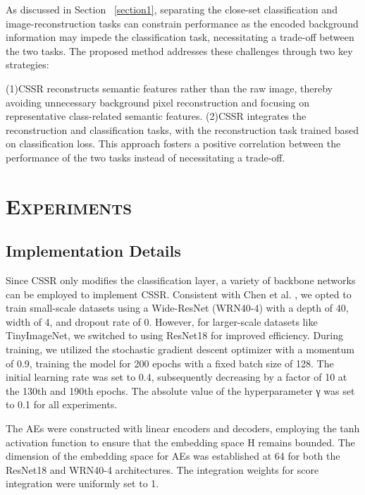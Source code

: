 \documentclass{gji}
\begin{document}
As discussed in Section ~\ref{section1}, separating the close-set classification and image-reconstruction tasks can constrain performance as the encoded background information may impede the classification task, necessitating a trade-off between the two tasks. The proposed method addresses these challenges through two key strategies:

(1)CSSR reconstructs semantic features rather than the raw image, thereby avoiding unnecessary background pixel reconstruction and focusing on representative class-related semantic features.
(2)CSSR integrates the reconstruction and classification tasks, with the reconstruction task trained based on classification loss. This approach fosters a positive correlation between the performance of the two tasks instead of necessitating a trade-off.


\section[]{\textbf\mdseries \textsc{E}\lowercase{\textsc{XPERIMENTS}}} 

\subsection{Implementation Details}
    Since CSSR only modifies the classification layer, a variety of backbone networks can be employed to implement CSSR. Consistent with Chen et al. \cite{4}, we opted to train small-scale datasets using a Wide-ResNet (WRN40-4) \cite{45} with a depth of 40, width of 4, and dropout rate of 0. However, for larger-scale datasets like TinyImageNet, we switched to using ResNet18 \cite{13} for improved efficiency. During training, we utilized the stochastic gradient descent optimizer with a momentum of 0.9, training the model for 200 epochs with a fixed batch size of 128. The initial learning rate was set to 0.4, subsequently decreasing by a factor of 10 at the 130th and 190th epochs. The absolute value of the hyperparameter γ was set to 0.1 for all experiments.

    The AEs were constructed with linear encoders and decoders, employing the tanh activation function to ensure that the embedding space H remains bounded. The dimension of the embedding space for AEs was established at 64 for both the ResNet18 and WRN40-4 architectures. The integration weights for score integration were uniformly set to 1.
\end{document}
